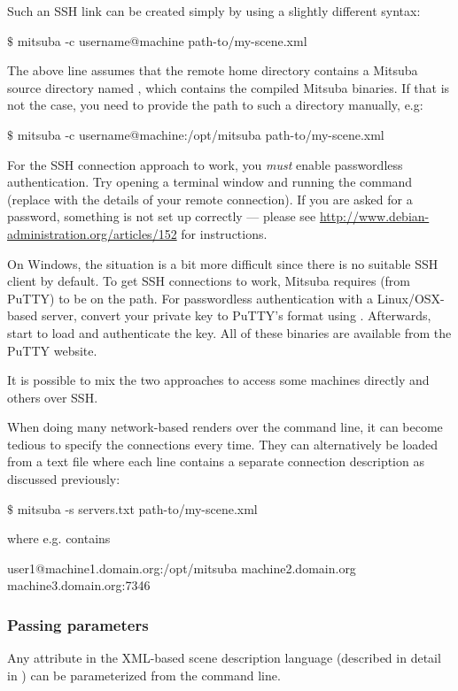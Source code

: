 \begin{itemize}
    Such an SSH link can be created simply by using a slightly different syntax:
\begin{shell}
$\texttt{\$}$ mitsuba -c username@machine path-to/my-scene.xml
\end{shell}
    The above line assumes that the remote home directory contains
    a Mitsuba source directory named ,
    which contains the compiled Mitsuba binaries.
    If that is not the case, you need to provide the path to such a directory manually, e.g:
\begin{shell}
$\texttt{\$}$ mitsuba -c username@machine:/opt/mitsuba path-to/my-scene.xml
\end{shell}
    For the SSH connection approach to work, you \emph{must} enable passwordless
    authentication.
    Try opening a terminal window and running the command 
    (replace with the details of your remote connection).
    If you are asked for a password, something is not set up correctly --- please see
    \url{http://www.debian-administration.org/articles/152} for instructions.

    On Windows, the situation is a bit more difficult since there is no suitable SSH client by
    default. To get SSH connections to work, Mitsuba requires  (from PuTTY) to
    be on the path. For passwordless authentication with a Linux/OSX-based
    server, convert your private key to PuTTY's format using .
    Afterwards, start  to load and  authenticate the key. All
    of these binaries are available from the PuTTY website.

    It is possible to mix the two approaches to access some machines directly and others
    over SSH.
\end{itemize}
When doing many network-based renders over the command line, it can become tedious to
specify the connections every time. They can alternatively be loaded from a text file
where each line contains a separate connection description as discussed previously:
\begin{shell}
$\texttt{\$}$ mitsuba -s servers.txt path-to/my-scene.xml
\end{shell}
where  e.g. contains
\begin{shell}
user1@machine1.domain.org:/opt/mitsuba
machine2.domain.org
machine3.domain.org:7346
\end{shell}
\subsubsection{Passing parameters}
Any attribute in the XML-based scene description language (described in detail in )
can be parameterized from the command line.

